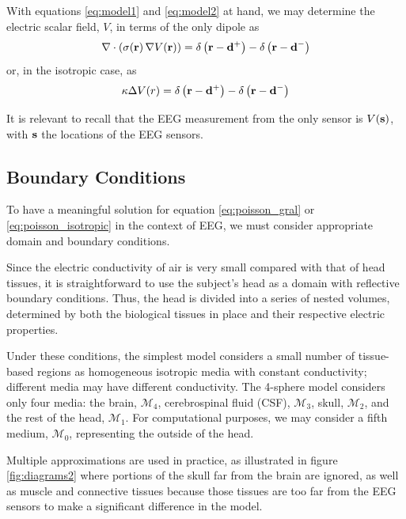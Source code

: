 With equations \eqref{eq:model1} and \eqref{eq:model2} at hand, we may determine the electric scalar field, $V$, in terms of the only dipole as
\begin{equation}
\nabla \cdot\left( \sigma(\mathbf{r})\, \nabla V(\mathbf{r})  \right) = 
{\delta\left( \mathbf{r}-\mathbf{d}^+ \right) - \delta\left( \mathbf{r}-\mathbf{d}^- \right)}
\label{eq:poisson_gral}
\end{equation}
or, in the isotropic case, as
\begin{equation}
\kappa \Delta V(r) = 
{\delta\left( \mathbf{r}-\mathbf{d}^+ \right) - \delta\left( \mathbf{r}-\mathbf{d}^- \right)}
\label{eq:poisson_isotropic}
\end{equation}

It is relevant to recall that the EEG measurement from the only sensor is $V(\mathbf{s})$, with $\mathbf{s}$ the locations of the EEG sensors.


\subsection{Boundary Conditions}

To have a meaningful solution for equation \eqref{eq:poisson_gral} or \eqref{eq:poisson_isotropic} in the context of EEG, we must consider appropriate domain and boundary conditions.

Since the electric conductivity of air is very small compared with that of head tissues, it is straightforward to use the subject's head as a domain with reflective boundary conditions. 
%
Thus, the head is divided into a series of nested volumes, determined by both the biological tissues in place and their respective electric properties.

Under these conditions, the simplest model considers a small number of tissue-based regions as homogeneous isotropic media with constant conductivity; different media may have different conductivity.
%
The 4-sphere model considers only four media: the brain, $\mathcal{M}_4$, cerebrospinal fluid (CSF), $\mathcal{M}_3$, skull, $\mathcal{M}_2$, and the rest of the head, $\mathcal{M}_1$.
%
For computational purposes, we may consider a fifth medium, $\mathcal{M}_0$, representing the outside of the head.

Multiple approximations are used in practice, as illustrated in figure \ref{fig:diagrams2} where portions of the skull far from the brain are ignored, as well as muscle and connective tissues 
because those tissues are too far from the EEG sensors to make a significant difference in the model.

